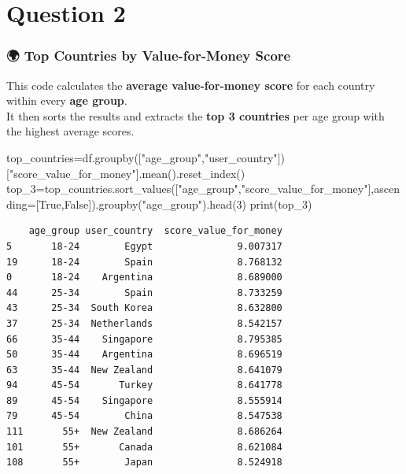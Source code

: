 \documentclass[
  letterpaper,
  DIV=11,
  numbers=noendperiod]{scrartcl}
\newenvironment{Shaded}{\begin{snugshade}}{\end{snugshade}}
\newcommand{\BuiltInTok}[1]{\textcolor[rgb]{0.00,0.23,0.31}{#1}}
\newcommand{\DecValTok}[1]{\textcolor[rgb]{0.68,0.00,0.00}{#1}}
\newcommand{\NormalTok}[1]{\textcolor[rgb]{0.00,0.23,0.31}{#1}}
\newcommand{\OperatorTok}[1]{\textcolor[rgb]{0.37,0.37,0.37}{#1}}
\newcommand{\StringTok}[1]{\textcolor[rgb]{0.13,0.47,0.30}{#1}}
\newcommand{\VariableTok}[1]{\textcolor[rgb]{0.07,0.07,0.07}{#1}}
\begin{document}
\section{Question 2}\label{question-2}

\subsubsection{🌍 Top Countries by Value-for-Money
Score}\label{top-countries-by-value-for-money-score}

This code calculates the \textbf{average value-for-money score} for each
country within every \textbf{age group}.\\
It then sorts the results and extracts the \textbf{top 3 countries} per
age group with the highest average scores.

\begin{Shaded}
\begin{Highlighting}[]
\NormalTok{top\_countries}\OperatorTok{=}\NormalTok{df.groupby([}\StringTok{"age\_group"}\NormalTok{,}\StringTok{"user\_country"}\NormalTok{])[}\StringTok{"score\_value\_for\_money"}\NormalTok{].mean().reset\_index()}
\NormalTok{top\_3}\OperatorTok{=}\NormalTok{top\_countries.sort\_values([}\StringTok{"age\_group"}\NormalTok{,}\StringTok{"score\_value\_for\_money"}\NormalTok{],ascending}\OperatorTok{=}\NormalTok{[}\VariableTok{True}\NormalTok{,}\VariableTok{False}\NormalTok{]).groupby(}\StringTok{"age\_group"}\NormalTok{).head(}\DecValTok{3}\NormalTok{)}
\BuiltInTok{print}\NormalTok{(top\_3)}
\end{Highlighting}
\end{Shaded}

\begin{verbatim}
    age_group user_country  score_value_for_money
5       18-24        Egypt               9.007317
19      18-24        Spain               8.768132
0       18-24    Argentina               8.689000
44      25-34        Spain               8.733259
43      25-34  South Korea               8.632800
37      25-34  Netherlands               8.542157
66      35-44    Singapore               8.795385
50      35-44    Argentina               8.696519
63      35-44  New Zealand               8.641079
94      45-54       Turkey               8.641778
89      45-54    Singapore               8.555914
79      45-54        China               8.547538
111       55+  New Zealand               8.686264
101       55+       Canada               8.621084
108       55+        Japan               8.524918
\end{verbatim}
\end{document}
